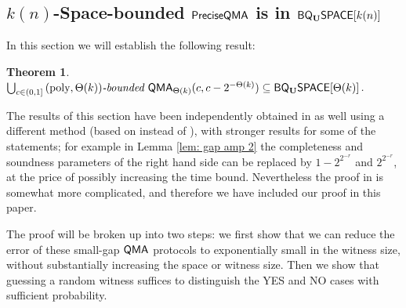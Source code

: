 \documentclass[11pt]{article}
\newtheorem{theorem}{Theorem}
\theoremstyle{definition}
\theoremstyle{remark}
\newcommand\QMA{{\sf{QMA}}}
\newcommand\QMAexp{{\sf{PreciseQMA}}}
\newcommand\bddQMA[5]{{\left(#1,#2\right)}\textit{-bounded }\QMA_{#3}(#4,#5)}
\newcommand{\classfont}{\sf}
\newcommand{\Unitary}{\mathbf{U}}
\newcommand{\unitaryBQSPACE}[1]{{\classfont{BQ}_\Unitary\classfont{SPACE}}[#1]}
\newcommand{\poly}{\textrm{poly}}
\begin{document}
\subsection{$k(n)$-Space-bounded $\QMAexp$ is in $\unitaryBQSPACE{k(n)}$} \label{subsec:bddqma-in-bqspace}
In this section we will establish the following result:
\begin{theorem} \label{thm: pspace upper bound}$
\bigcup_{c \in (0,1]}\bddQMA{\poly}{\Theta(k)}{\Theta(k)}{c}{c-2^{-\Theta(k)}} \subseteq \unitaryBQSPACE{\Theta(k)}$.
\end{theorem}
The results of this section have been independently obtained in \cite{fklmn16} as well using a different method (based on \cite{kln15} instead of \cite{nwz11}), with stronger results for some of the statements; for example in Lemma \ref{lem: gap amp 2} the completeness and soundness parameters of the right hand side can be replaced by $1-2^{2^{-r}}$ and $2^{2^{-r}}$, at the price of possibly increasing the time bound. Nevertheless the proof in \cite{fklmn16} is somewhat more complicated, and therefore we have included our proof in this paper.

The proof will be broken up into two steps: we first show that we can reduce the error of these small-gap $\QMA$ protocols to exponentially small in the witness size, without substantially increasing the space or witness size. Then we show that guessing a random witness suffices to distinguish the YES and NO cases with sufficient probability.
\end{document}
